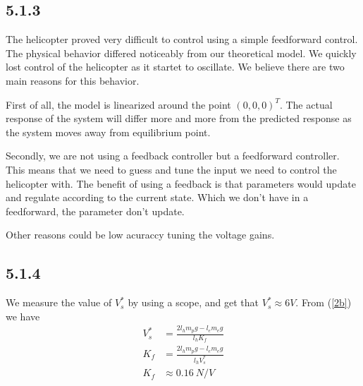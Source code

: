 \subsection*{5.1.3}
The helicopter proved very difficult to control using a simple feedforward control. The physical behavior differed noticeably from our theoretical model. We quickly lost control of the helicopter as it startet to oscillate. We believe there are two main reasons for this behavior. 

First of all, the model is linearized around the point $(0, 0, 0)^T$. The actual response of the system will differ more and more from the predicted response as the system moves away from equilibrium point.

Secondly, we are not using a feedback controller but a feedforward controller. This means that we need to guess and tune the input we need to control the helicopter with. The benefit of using a feedback is that parameters would update and regulate according to the current state. Which we don't have in a feedforward, the parameter don't update. 

Other reasons could be low acuraccy tuning the voltage gains. 

\subsection*{5.1.4}
We measure the value of $V_s^{\ast}$ by using a scope, and get that $V_s^{\ast} \approx 6V$. From (\ref{2b}) we have
\begin{align*}
    V_s^{\ast}  &= \frac{2l_hm_pg-l_em_eg}{l_hK_f}\\
    K_f         &= \frac{2l_hm_pg-l_em_eg}{l_hV_s^{\ast}}\\
    K_f         &\approx 0.16\ N/V
\end{align*}



